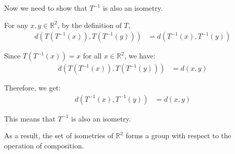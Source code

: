 \documentclass{article}
\begin{document}
\begin{enumerate}[(i)]
Now we need to show that $T^{-1}$ is also an isometry.

For any $x,y \in \mathbb{R}^2$, by the definition of $T$,
\begin{align*}
d(T(T^{-1}(x)), T(T^{-1}(y))) &= d(T^{-1}(x), T^{-1}(y))
\end{align*}

Since $T(T^{-1}(x)) = x$ for all $x \in \mathbb{R}^2$, we have:
\begin{align*}
d(T(T^{-1}(x)), T(T^{-1}(y))) &= d(x,y)
\end{align*}

Therefore, we get:
\begin{align*}
d(T^{-1}(x), T^{-1}(y)) &= d(x,y)
\end{align*}

This means that $T^{-1}$ is also an isometry.

\end{enumerate}


As a result, the set of isometries of $\mathbb{R}^2$ forms a group with respect to the operation of composition.
\end{document}
